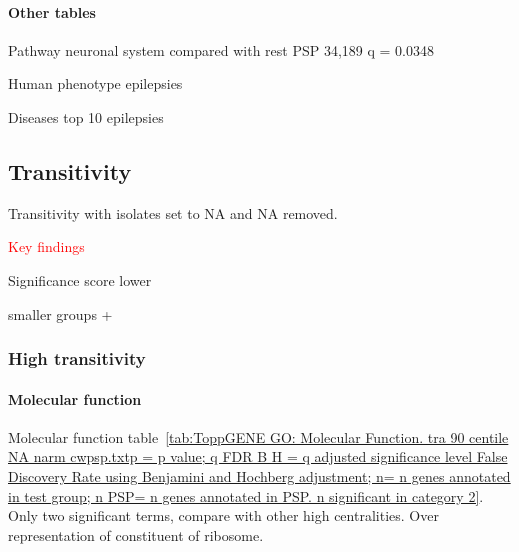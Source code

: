 \paragraph{Other tables}
Pathway neuronal system compared with rest PSP  34,189 q = 0.0348

Human phenotype epilepsies 

Diseases top 10 epilepsies  



\clearpage


\subsection{Transitivity}
Transitivity with isolates set to NA and NA removed. 

\textcolor{red}{Key findings}

Significance score lower

smaller groups
+

\subsubsection{High transitivity}
\paragraph{Molecular function}
Molecular function table~\ref{tab:ToppGENE GO: Molecular Function. tra 90 centile NA narm cwpsp.txtp = p value; q FDR B H = q adjusted significance level False Discovery Rate using Benjamini and Hochberg adjustment; n= n genes annotated in test group; n PSP= n genes annotated in PSP. n significant in category 2}. Only two significant terms, compare with other high centralities. Over representation of constituent of ribosome. 


